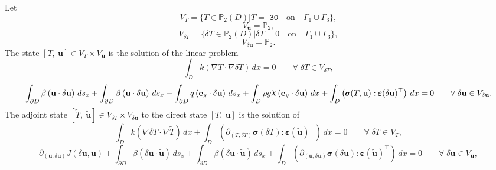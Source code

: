 \documentclass[preview]{standalone}
\let\oldcdot\cdot
\let\cdot\oldcdot
\begin{document}
Let
\begin{equation*}
V_{T} = \{ T \in \mathbb P_{2}(D)| T = \mathtt{\text{-30}}  \quad \text{{on}} \quad\Gamma_{1}\cup\Gamma_{3} \},\end{equation*}
\begin{equation*}
V_{{\mathbf{ u }}} = \mathbb P_{2},\end{equation*}
\begin{equation*}
V_{\delta T} = \{ \delta T \in \mathbb P_{2}(D)| \delta T = 0  \quad \text{{on}} \quad\Gamma_{1}\cup\Gamma_{3} \},\end{equation*}
\begin{equation*}
V_{{\delta\mathbf{  u }}} = \mathbb P_{2}.\end{equation*}
The state $\left[ T, \  {\mathbf{ u }}\right] \in  V_{T}\times V_{{\mathbf{ u }}}$ is the solution of the linear problem
\begin{dmath*}
 \int_{D} k \left(  \nabla T  \cdot  \nabla \delta T  \right) \,dx = 0\qquad \forall\; {\delta T\in V_{\delta T}} , 
\end{dmath*}
\begin{dmath*}
 \int_{\partial D} \beta \left( {\mathbf{ u }} \cdot {\delta\mathbf{  u }} \right) \,ds_x +  \int_{\partial D} \beta \left( {\mathbf{ u }} \cdot {\delta\mathbf{  u }} \right) \,ds_x +  \int_{\partial D} q \left( \mathbf e_y \cdot {\delta\mathbf{  u }} \right) \,ds_x +  \int_{D} \rho g \raisebox{\depth}{$\chi$} \left( \mathbf e_y \cdot {\delta\mathbf{  u }} \right) \,dx +  \int_{D} \left( \pmb\sigma(T,{\mathbf{ u }}) \mathrel{:}  \pmb\varepsilon({\delta\mathbf{  u }})^\top  \right) \,dx = 0\qquad \forall\; {{\delta\mathbf{  u }}\in V_{{\delta\mathbf{  u }}}} . 
\end{dmath*}
The adjoint state $\left[ \tilde T, \  \tilde{\mathbf{ u }}\right] \in  V_{\delta T}\times V_{{\delta\mathbf{  u }}}$ to the direct state $\left[ T, \  {\mathbf{ u }}\right]$ is the solution of
\begin{dmath*}
 \int_{D} k \left(  \nabla \delta T  \cdot  \nabla \tilde T  \right) \,dx +  \int_{D} \left( \partial_{(T,\delta T)} \pmb\sigma(\delta T) \mathrel{:}  \pmb\varepsilon(\tilde{\mathbf{ u }})^\top  \right) \,dx = 0\qquad \forall\; {\delta T\in V_{T}} , 
\end{dmath*}
\begin{dmath*}
\partial_{({\mathbf{ u }},{\delta\mathbf{  u }})} J({\delta\mathbf{  u }},{\mathbf{ u }}) +  \int_{\partial D} \beta \left( {\delta\mathbf{  u }} \cdot \tilde{\mathbf{ u }} \right) \,ds_x +  \int_{\partial D} \beta \left( {\delta\mathbf{  u }} \cdot \tilde{\mathbf{ u }} \right) \,ds_x +  \int_{D} \left( \partial_{({\mathbf{ u }},{\delta\mathbf{  u }})} \pmb\sigma({\delta\mathbf{  u }}) \mathrel{:}  \pmb\varepsilon(\tilde{\mathbf{ u }})^\top  \right) \,dx = 0\qquad \forall\; {{\delta\mathbf{  u }}\in V_{{\mathbf{ u }}}} , 
\end{dmath*}
\end{document}
